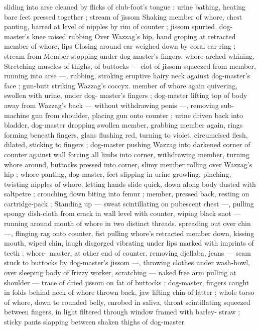 sliding into arse cleaned by flicks of club-foot's tongue ; urine
bathing, heating bare feet pressed together ; stream of jissom
Shaking member of whore, chest panting, barred at level of nipples
by rim of counter ; jissom spurted, dog-master's knee raised rubbing
Over Wazzag's hip, hand groping at retracted member of whore, lips
Closing around ear weighed down by coral ear-ring ; stream from
Member stopping under dog-master's fingers, whore arched whining,
Stretching muscles of thighs, of buttocks --- clot of jissom squeezed
from member, running into arse ---, rubbing, stroking eruptive hairy
neck against dog-master's face ; gun-butt striking Wazzag's coccyx.
member of whore again quivering, swollen with urine, under dog-
master's fingers ; dog-master lifting top of body away from Wazzag's
back --- without withdrawing penis ---, removing sub-machine gun
from shoulder, placing gun onto counter ; urine driven back into
bladder, dog-master dropping swollen member, grabbing member
again, rings forming beneath fingers, glans flushing red, turning to
violet, circumcised flesh, dilated, sticking to fingers ; dog-master
pushing Wazzag into darkened corner of counter against wall
forcing all limbs into corner, withdrawing member, turning whore
around, buttocks pressed into corner, slimy member rolling over
Wazzag's hip ; whore panting, dog-master, feet slipping in urine
growling, pinching, twisting nipples of whore, letting hands slide
quick, down along body dusted with saltpetre ; crouching down
biting into femur ; member, pressed back, resting on cartridge-pack
; Standing up --- sweat scintillating on pubescent chest ---, pulling
spongy dish-cloth from crack in wall level with counter, wiping black
snot --- running around mouth of whore in two distinct threads.
spreading out over chin ---, flinging rag onto counter, fist pulling
whore's retracted member down, kissing mouth, wiped chin, laugh
disgorged vibrating under lips marked with imprints of teeth ; whore-
master, at other end of counter, removing djellaba, jeans --- seam
stuck to buttocks by dog-master's jissom ---, throwing clothes under
wash-bowl, over sleeping body of frizzy worker, scratching --- naked
free arm pulling at shoulder --- trace of dried jissom on fat of
buttocks ; dog-master, fingers caught in folds behind neck of whore
thrown back, jaw lifting chin of latter ; whole torso of whore, down to
rounded belly, enrobed in saliva, throat scintillating squeezed
between fingers, in light filtered through window framed with barley-
straw ; sticky pants slapping between shaken thighs of dog-master
